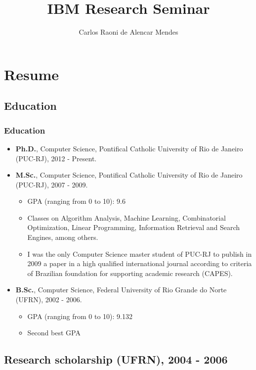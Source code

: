 \documentclass{beamer}
\title{IBM Research Seminar}
\author{Carlos Raoni de Alencar Mendes}
\institute{Software Engineer - Petrobras \\
\texttt{carlosraoni@gmail.com} }
\begin{document}
\frame{\titlepage}

\begin{frame}
	\scriptsize
  \tableofcontents[pausesections]
\end{frame}

\section{Resume}
\subsection{Education}

\begin{frame}
  \frametitle{Education}
{
	\begin{itemize}
		\item<1-> {\bf Ph.D.}, Computer Science, Pontifical Catholic University of Rio
		de Janeiro (PUC-RJ), 2012 - Present.			
  		\item<2-> {\bf M.Sc.}, Computer Science, Pontifical Catholic University of
  		Rio de Janeiro (PUC-RJ), 2007 - 2009.
  			\begin{itemize}
			  \item GPA (ranging from 0 to 10): 9.6
			  \item Classes on Algorithm Analysis, Machine Learning, Combinatorial
			  Optimization, Linear Programming, Information Retrieval and Search Engines, among others.
			  \item I was the only Computer Science master student of PUC-RJ to publish in 2009 a paper in a high 
qualified international journal according to criteria of Brazilian foundation
for supporting academic research (CAPES).
			\end{itemize}
  		\item<3-> {\bf B.Sc.}, Computer Science, Federal University of Rio Grande do
  		Norte (UFRN), 2002 - 2006.
  			\begin{itemize}
			  \item GPA (ranging from 0 to 10): 9.132
			  \item Second best GPA
			\end{itemize}
  \end{itemize}
}

\end{frame}

\subsection{Research scholarship (UFRN), 2004 - 2006}
\end{document}
